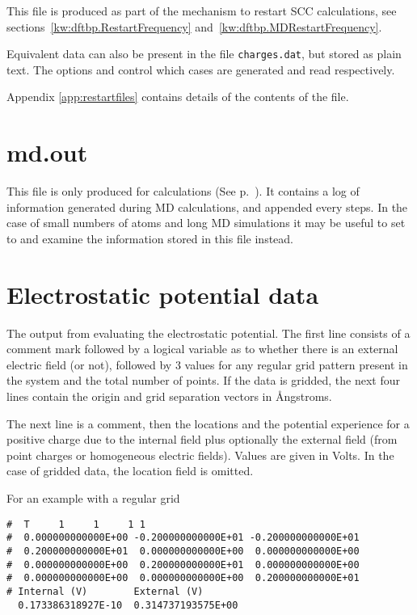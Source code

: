 This file is produced as part of the mechanism to restart SCC calculations, see
sections~\ref{kw:dftbp.RestartFrequency} and~\ref{kw:dftbp.MDRestartFrequency}.

Equivalent data can also be present in the file \verb|charges.dat|, but stored
as plain text. The options  and 
control which cases are generated and read respectively.

Appendix \ref{app:restartfiles} contains details of the contents of the file.

\section{md.out}
\label{sec:md.out}

This file is only produced for  calculations (See
p.~). It contains a log of information generated during MD
calculations, and appended every  steps. In the case of
small numbers of atoms and long MD simulations it may be useful to set
 to  and examine the information stored in this file
instead.

\section{Electrostatic potential data}
\label{sec:dftbp.esp}

The output from evaluating the electrostatic potential. The first line
consists of a comment mark followed by a logical variable as to whether there is
an external electric field (or not), followed by 3 values for any regular grid
pattern present in the system and the total number of points. If the data is
gridded, the next four lines contain the origin and grid separation vectors in
{\AA}ngstroms.

The next line is a comment, then the locations and the potential experience for
a positive charge due to the internal field plus optionally the external field
(from point charges or homogeneous electric fields). Values are given in
Volts. In the case of gridded data, the location field is omitted.

For an example with a regular grid
\begin{verbatim}
#  T     1     1     1 1
#  0.000000000000E+00 -0.200000000000E+01 -0.200000000000E+01
#  0.200000000000E+01  0.000000000000E+00  0.000000000000E+00
#  0.000000000000E+00  0.200000000000E+01  0.000000000000E+00
#  0.000000000000E+00  0.000000000000E+00  0.200000000000E+01
# Internal (V)        External (V)
  0.173386318927E-10  0.314737193575E+00
\end{verbatim}

